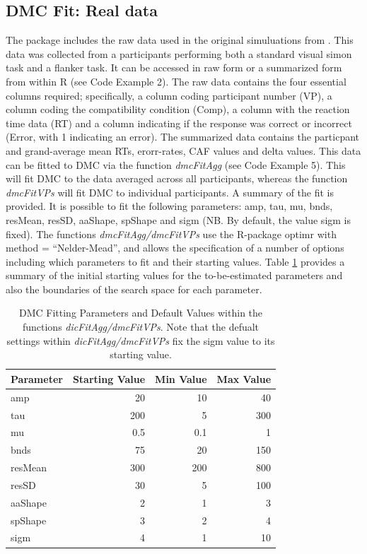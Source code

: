 \subsection{DMC Fit: Real data} 
\label{dmc_fit} 

The package includes the raw data used in the original simuluations from
\textcite{ulrich2015automatic}. This data was collected from a participants
performing both a standard visual simon task and a flanker task. It can be
accessed in raw form or a summarized form from within R (see Code Example 2).
The raw data contains the four essential columns required; specifically, a
column coding participant number (VP), a column coding the compatibility
condition (Comp), a column with the reaction time data (RT) and a column
indicating if the response was correct or incorrect (Error, with 1 indicating
an error). The summarized data contains the particpant and grand-average mean
RTs, erorr-rates, CAF values and delta values. This data can be fitted to DMC
via the function \textit{dmcFitAgg} (see Code Example 5). This will fit DMC to
the data averaged across all participants, whereas the function
\textit{dmcFitVPs} will fit DMC to individual participants. A summary of the
fit is provided. It is possible to fit the following parameters: amp, tau, mu,
bnds, resMean, resSD, aaShape, spShape and sigm (NB. By default, the value sigm
is fixed). The functions \textit{dmcFitAgg/dmcFitVPs} use the R-package optimr
\parencite{optimr} with method = ``Nelder-Mead'', and allows the specification
of a number of options including which parameters to fit and their starting
values. Table \ref{tab:dmc_fit_parameters} provides a summary of the initial
starting values for the to-be-estimated parameters and also the boundaries of
the search space for each parameter. 

\begin{table}
    \centering
    \caption{
        DMC Fitting Parameters and Default Values within the functions
        \textit{dicFitAgg/dmcFitVPs}. Note that the defualt settings within
        \textit{dicFitAgg/dmcFitVPs} fix the sigm value to its starting value.
    }
    \begin{tabular}{lrrr}
        \hline
        Parameter&Starting Value&Min Value& Max Value \\ 
        \hline
        amp     &  20   &  10    &  40 \\ 
        tau     & 200   &   5    & 300 \\ 
        mu      &   0.5 &   0.1  &   1 \\ 
        bnds    &  75   &  20    & 150 \\ 
        resMean & 300   & 200    & 800 \\ 
        resSD   &  30   &   5    & 100 \\ 
        aaShape &   2   &   1    &   3 \\ 
        spShape &   3   &   2    &   4 \\ 
        sigm    &   4   &   1    &  10 \\ 
        \hline
    \end{tabular}
    \label{tab:dmc_fit_parameters}
\end{table}

